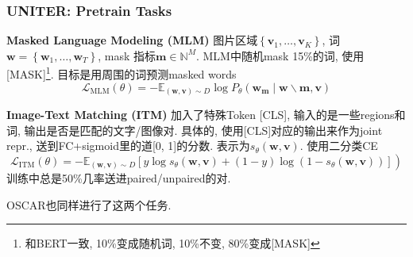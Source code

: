\documentclass{beamer}
\newcommand{\bt}[1]{\textbf{#1}}
\newenvironment{remark}[1][Remark]{\begin{trivlist}
    \item[\hskip \labelsep {\bfseries #1}]}{\end{trivlist}}
\begin{document}
\begin{frame}
    \frametitle{UNITER: Pretrain Tasks}

    \bt{Masked Language Modeling (MLM)} 图片区域$\left\{\mathbf{v}_{1}, \ldots, \mathbf{v}_{K}\right\}$, 词$\mathbf{w}=\left\{\mathbf{w}_{1}, \ldots, \mathbf{w}_{T}\right\}$, mask 指标$\mathbf{m} \in \mathbb{N}^{M}$. 
    MLM中随机mask 15\%的词, 使用[MASK]\footnote{
        和BERT一致, 10\%变成随机词, 10\%不变, 80\%变成[MASK]
    }. 目标是用周围的词预测masked words
    \begin{equation}
        \mathcal{L}_{\mathrm{MLM}}(\theta)=-\mathbb{E}_{(\mathbf{w}, \mathbf{v}) \sim D} \log P_{\theta}\left(\mathbf{w}_{\mathbf{m}} \mid \mathbf{w} \backslash \mathbf{m}, \mathbf{v}\right)
    \end{equation}

    \bt{Image-Text Matching (ITM)} 加入了特殊Token [CLS], 输入的是一些regions和词, 输出是否是匹配的文字/图像对. 具体的, 使用[CLS]对应的输出来作为joint repr., 送到FC+sigmoid里的道[0, 1]的分数. 表示为$s_{\theta}(\mathbf{w}, \mathbf{v})$. 使用二分类CE
    \begin{equation}
        \left.\mathcal{L}_{\mathrm{ITM}}(\theta)=-\mathbb{E}_{(\mathbf{w}, \mathbf{v}) \sim D}\left[y \log s_{\theta}(\mathbf{w}, \mathbf{v})+(1-y) \log \left(1-s_{\theta}(\mathbf{w}, \mathbf{v})\right)\right]\right)
    \end{equation}
    训练中总是50\%几率送进paired/unpaired的对.

    \begin{remark}
        OSCAR也同样进行了这两个任务.
    \end{remark}

\end{frame}
\end{document}
